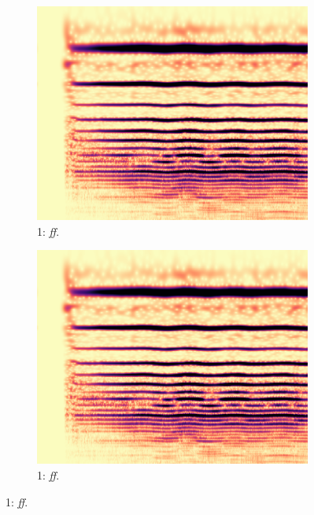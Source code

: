 \begin{figure}
        \begin{subfigure}{0.20\textwidth}
                \centering
                \includegraphics[width=\linewidth]{./figs/demo/Vn-ord-G4-ff-4c.png}
                \caption*{1: \emph{ff}.}
                \label{fig:Vn-ord-G4-ff-4c}
        \end{subfigure}%
        \begin{subfigure}{0.20\textwidth}
                \centering
                \includegraphics[width=\linewidth]{./figs/demo/Vn-ord-G4-ff-4c.png}
                \caption*{1: \emph{ff}.}
                \label{fig:Vn-ord-G4-ff-4c-bis}
        \end{subfigure}%


\end{figure}
